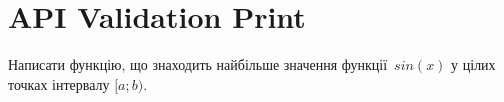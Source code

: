 \documentclass[12pt]{article}
\begin{document}
\section*{API Validation Print}

Написати функцію, що знаходить найбільше значення функції~$sin(x)$ у цілих точках інтервалу $[a; b)$.


\end{document}
